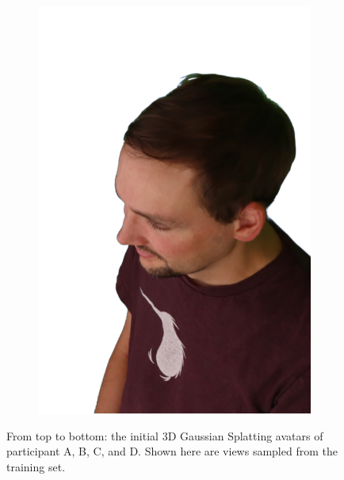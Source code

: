 \begin{figure}[!ht]
\begin{subfigure}{0.12\linewidth}
        \includegraphics[width=\textwidth]{Figures/results/initials/simon/22_render.png}
	\end{subfigure}
    \caption{From top to bottom: the initial 3D Gaussian Splatting avatars of participant A, B, C, and D. Shown here are views sampled from the training set.}
    \label{fig:igs2gs_init_participants}
\end{figure}

